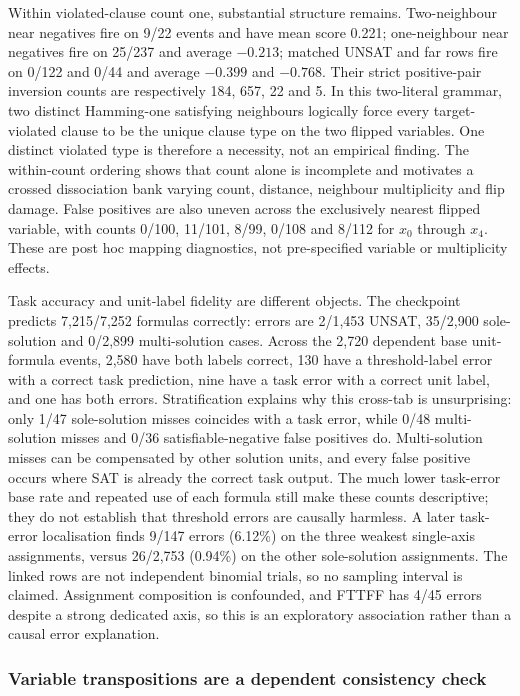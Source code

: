 \documentclass[
  british,
  11pt,
  a4paper,
]{article}
\begin{document}
Within violated-clause count one, substantial structure remains.
Two-neighbour near negatives fire on 9/22 events and have mean score
0.221; one-neighbour near negatives fire on 25/237 and average
\(-0.213\); matched UNSAT and far rows fire on 0/122 and 0/44 and
average \(-0.399\) and \(-0.768\). Their strict positive-pair inversion
counts are respectively 184, 657, 22 and 5. In this two-literal grammar,
two distinct Hamming-one satisfying neighbours logically force every
target-violated clause to be the unique clause type on the two flipped
variables. One distinct violated type is therefore a necessity, not an
empirical finding. The within-count ordering shows that count alone is
incomplete and motivates a crossed dissociation bank varying count,
distance, neighbour multiplicity and flip damage. False positives are
also uneven across the exclusively nearest flipped variable, with counts
0/100, 11/101, 8/99, 0/108 and 8/112 for \(x_0\) through \(x_4\). These
are post hoc mapping diagnostics, not pre-specified variable or
multiplicity effects.

Task accuracy and unit-label fidelity are different objects. The
checkpoint predicts 7,215/7,252 formulas correctly: errors are 2/1,453
UNSAT, 35/2,900 sole-solution and 0/2,899 multi-solution cases. Across
the 2,720 dependent base unit-formula events, 2,580 have both labels
correct, 130 have a threshold-label error with a correct task
prediction, nine have a task error with a correct unit label, and one
has both errors. Stratification explains why this cross-tab is
unsurprising: only 1/47 sole-solution misses coincides with a task
error, while 0/48 multi-solution misses and 0/36 satisfiable-negative
false positives do. Multi-solution misses can be compensated by other
solution units, and every false positive occurs where SAT is already the
correct task output. The much lower task-error base rate and repeated
use of each formula still make these counts descriptive; they do not
establish that threshold errors are causally harmless. A later
task-error localisation finds 9/147 errors (6.12\%) on the three weakest
single-axis assignments, versus 26/2,753 (0.94\%) on the other
sole-solution assignments. The linked rows are not independent binomial
trials, so no sampling interval is claimed. Assignment composition is
confounded, and FTTFF has 4/45 errors despite a strong dedicated axis,
so this is an exploratory association rather than a causal error
explanation.

\subsubsection{Variable transpositions are a dependent consistency
check}\label{variable-transpositions-are-a-dependent-consistency-check}
\end{document}

